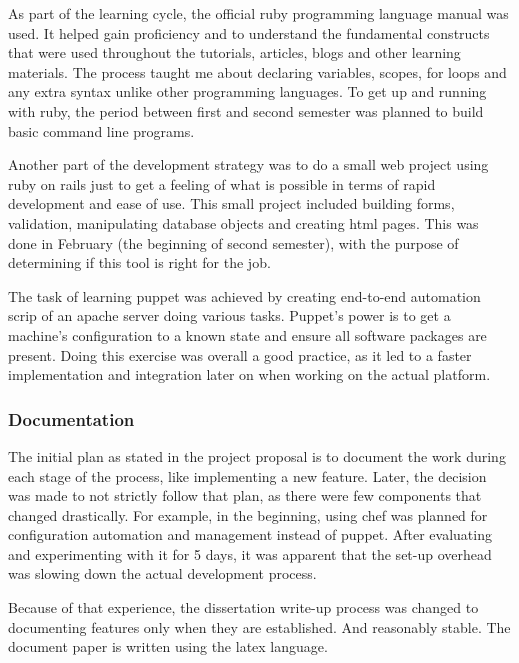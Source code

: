 \documentclass{article}
\begin{document}
As part of the learning cycle, the official ruby programming language manual was used. It helped gain proficiency and to understand the fundamental constructs that were used throughout the tutorials, articles, blogs and other learning materials. The process taught me about declaring variables, scopes, for loops and any extra syntax unlike other programming languages. To get up and running with \gls{ruby}, the period between first and second semester was planned to build basic command line programs.

Another part of the development strategy was to do a small web project using ruby on rails just to get a feeling of what is possible in terms of rapid development and ease of use. This small project included building forms, validation, manipulating database objects and creating \gls{html} pages. This was done in February (the beginning of second semester), with the purpose of determining if this tool is right for the job.

The task of learning \gls{puppet} was achieved by creating end-to-end automation scrip of an apache server doing various tasks. Puppet's power is to get a machine's configuration to a known state and ensure all software packages are present. Doing this exercise was overall a good practice, as it led to a faster implementation and integration later on when working on the actual platform.

\subsubsection{Documentation}
The initial plan as stated in the project proposal is to document the work during each stage of the process, like implementing a new feature. Later, the decision was made to not strictly follow that plan, as there were few components that changed drastically. For example, in the beginning, using chef was planned for configuration automation and management instead of puppet. After evaluating and experimenting with it for 5 days, it was apparent that the set-up overhead was slowing down the actual development process. 

Because of that experience, the dissertation write-up process was changed to documenting features only when they are established. And reasonably stable. The document paper is written using the latex language.
\end{document}
